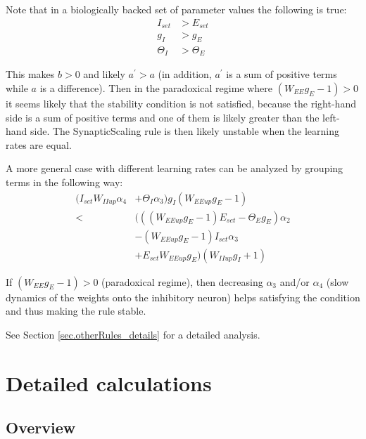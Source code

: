 \documentclass[twocolumn]{article}
\newcommand{\EE}{\mathit{EE}}
\newcommand{\II}{\mathit{II}}
\newcommand{\set}{\mathit{set}}
\newcommand{\up}{\mathit{up}}
\begin{document}
\noindent Note that in a biologically backed set of parameter values the following is true:
\begin{displaymath}
\begin{aligned}
I_{\set} & > E_{\set} \\
g_I & > g_E \\
\Theta_I & > \Theta_E
\end{aligned}
\end{displaymath}

\noindent This makes $b>0$ and likely $a^\prime>a$ (in addition, $a^\prime$ is a sum of positive terms while $a$ is a difference). Then in the paradoxical regime where $(W_{\EE}g_E - 1)>0$ it seems likely that the stability condition is not satisfied, because the right-hand side is a sum of positive terms and one of them is likely greater than the left-hand side. The SynapticScaling rule is then likely unstable when the learning rates are equal.

A more general case with different learning rates can be analyzed by grouping terms in the following way:
\begin{displaymath}
\begin{aligned}
(I_{\set} W_{\II\up} \alpha_4 & + \Theta_I\alpha_3) g_I(W_{\EE\up} g_E - 1) \\
< & (((W_{\EE\up} g_E - 1) E_{\set} - \Theta_E g_E)\alpha_2 \\
& -(W_{\EE\up} g_E - 1) I_{\set}\alpha_3 \\
& + E_{\set} W_{\EE\up} g_E) (W_{\II\up} g_I + 1)
\end{aligned}
\label{eq.SS_stable_cond_v3}
\end{displaymath}

\noindent If $(W_{EE}g_E - 1) > 0$ (paradoxical regime), then decreasing $\alpha_3$ and/or $\alpha_4$ (slow dynamics of the weights onto the inhibitory neuron) helps satisfying the condition and thus making the rule stable.

See Section \ref{sec.otherRules_details} for a detailed analysis.






\section{Detailed calculations}
\label{sec.Details}

\subsection{Overview}
\end{document}
